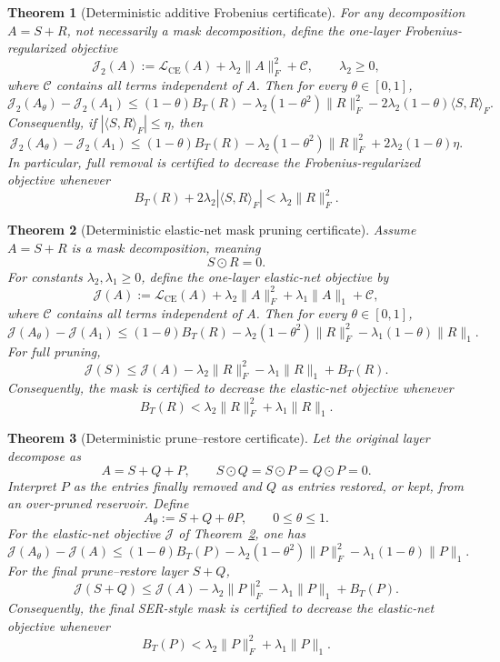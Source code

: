 \documentclass[11pt]{article}
\theoremstyle{plain}
\newtheorem{thm}{Theorem}[section]
\theoremstyle{definition}
\theoremstyle{remark}
\newcommand{\1}{\mathbf{1}}
\begin{document}
\begin{thm}[Deterministic additive Frobenius certificate]
\label{thm:deterministic_additive_frobenius_certificate}
For any decomposition \(A=S+R\), not necessarily a mask decomposition, define the one-layer Frobenius-regularized objective
\[
\mathcal J_2(A):=
\mathcal L_{\mathrm{CE}}(A)+\lambda_2\|A\|_F^2+\mathcal C,
\qquad \lambda_2\ge0,
\]
where \(\mathcal C\) contains all terms independent of \(A\). Then for every \(\theta\in[0,1]\),
\[
\mathcal J_2(A_\theta)-\mathcal J_2(A_1)
\le
(1-\theta)B_T(R)
-
\lambda_2(1-\theta^2)\|R\|_F^2
-
2\lambda_2(1-\theta)\langle S,R\rangle_F.
\]
Consequently, if \(|\langle S,R\rangle_F|\le\eta\), then
\[
\mathcal J_2(A_\theta)-\mathcal J_2(A_1)
\le
(1-\theta)B_T(R)
-
\lambda_2(1-\theta^2)\|R\|_F^2
+
2\lambda_2(1-\theta)\eta.
\]
In particular, full removal is certified to decrease the Frobenius-regularized objective whenever
\[
B_T(R)+2\lambda_2|\langle S,R\rangle_F|
<
\lambda_2\|R\|_F^2.
\]
\end{thm}

\begin{thm}[Deterministic elastic-net mask pruning certificate]
\label{thm:deterministic_mask_certificate}
Assume \(A=S+R\) is a mask decomposition, meaning
\[
S\odot R=0.
\]
For constants \(\lambda_2,\lambda_1\ge0\), define the one-layer elastic-net objective by
\[
\mathcal J(A):=
\mathcal L_{\mathrm{CE}}(A)
+\lambda_2\|A\|_F^2
+\lambda_1\|A\|_1
+\mathcal C,
\]
where \(\mathcal C\) contains all terms independent of \(A\). Then for every \(\theta\in[0,1]\),
\[
\mathcal J(A_\theta)-\mathcal J(A_1)
\le
(1-\theta)B_T(R)
-\lambda_2(1-\theta^2)\|R\|_F^2
-\lambda_1(1-\theta)\|R\|_1.
\]
For full pruning,
\[
\mathcal J(S)
\le
\mathcal J(A)
-\lambda_2\|R\|_F^2
-\lambda_1\|R\|_1
+B_T(R).
\]
Consequently, the mask is certified to decrease the elastic-net objective whenever
\[
B_T(R)
<
\lambda_2\|R\|_F^2+\lambda_1\|R\|_1.
\]
\end{thm}

\begin{thm}[Deterministic prune--restore certificate]
\label{thm:deterministic_prune_restore_certificate}
Let the original layer decompose as
\[
A=S+Q+P,
\qquad
S\odot Q=S\odot P=Q\odot P=0.
\]
Interpret \(P\) as the entries finally removed and \(Q\) as entries restored, or kept, from an over-pruned reservoir. Define
\[
A_\theta:=S+Q+\theta P,\qquad 0\le\theta\le1.
\]
For the elastic-net objective \(\mathcal J\) of Theorem~\ref{thm:deterministic_mask_certificate}, one has
\[
\mathcal J(A_\theta)-\mathcal J(A)
\le
(1-\theta)B_T(P)
-\lambda_2(1-\theta^2)\|P\|_F^2
-\lambda_1(1-\theta)\|P\|_1.
\]
For the final prune--restore layer \(S+Q\),
\[
\mathcal J(S+Q)
\le
\mathcal J(A)
-\lambda_2\|P\|_F^2
-\lambda_1\|P\|_1
+B_T(P).
\]
Consequently, the final SER-style mask is certified to decrease the elastic-net objective whenever
\[
B_T(P)<\lambda_2\|P\|_F^2+\lambda_1\|P\|_1.
\]
\end{thm}
\end{document}
